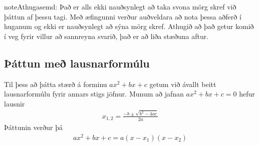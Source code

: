 \documentclass[a4paper,10pt,icelandic]{sphinxmanual}
\begin{document}
\begin{sphinxadmonition}{note}{Athugasemd:}
Það er alls ekki nauðsynlegt að taka svona mörg skref við þáttun af þessu tagi.
Með æfingunni verður auðveldara að nota þessa aðferð í huganum og ekki er nauðsynlegt að sýna mörg skref.
Athugið að það getur komið í veg fyrir villur að sannreyna svarið, það er að liða stæðuna aftur.
\end{sphinxadmonition}


\subsection{Þáttun með lausnarformúlu}
\label{\detokenize{Kafli02:attun-me-lausnarformulu}}
Til þess að þátta stærð á forminu \(ax^2+bx+c\) getum við ávallt beitt lausnarformúlu fyrir annars stigs jöfnur. Munum að jafnan \(ax^2+bx+c=0\) hefur lausnir
\begin{equation*}
\begin{split}x_{1,2}=\frac{-b \pm \sqrt{b^2-4ac}}{2a}\end{split}
\end{equation*}
Þáttunin verður þá
\begin{equation*}
\begin{split}ax^2+bx+c=a(x-x_1)(x-x_2)\end{split}
\end{equation*}
\end{document}
